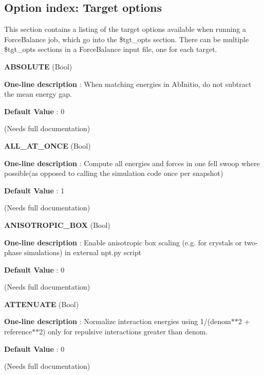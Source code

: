 \hypertarget{glossary_tgt_option_index}{}\subsection{\-Option index\-: Target options}\label{glossary_tgt_option_index}
\-This section contains a listing of the target options available when running a \-Force\-Balance job, which go into the \$tgt\-\_\-opts section. \-There can be multiple \$tgt\-\_\-opts sections in a \-Force\-Balance input file, one for each target.

\begin{DoxyItemize}
\item {\bfseries  \-A\-B\-S\-O\-L\-U\-T\-E } (\-Bool) \par
{\bfseries  \-One-\/line description }\-: \-When matching energies in \-Ab\-Initio, do not subtract the mean energy gap. \par
{\bfseries  \-Default \-Value }\-: 0 \par
(\-Needs full documentation)\end{DoxyItemize}
\begin{DoxyItemize}
\item {\bfseries  \-A\-L\-L\-\_\-\-A\-T\-\_\-\-O\-N\-C\-E } (\-Bool) \par
{\bfseries  \-One-\/line description }\-: \-Compute all energies and forces in one fell swoop where possible(as opposed to calling the simulation code once per snapshot) \par
{\bfseries  \-Default \-Value }\-: 1 \par
(\-Needs full documentation)\end{DoxyItemize}
\begin{DoxyItemize}
\item {\bfseries  \-A\-N\-I\-S\-O\-T\-R\-O\-P\-I\-C\-\_\-\-B\-O\-X } (\-Bool) \par
{\bfseries  \-One-\/line description }\-: \-Enable anisotropic box scaling (e.\-g. for crystals or two-\/phase simulations) in external npt.\-py script \par
{\bfseries  \-Default \-Value }\-: 0 \par
(\-Needs full documentation)\end{DoxyItemize}
\begin{DoxyItemize}
\item {\bfseries  \-A\-T\-T\-E\-N\-U\-A\-T\-E } (\-Bool) \par
{\bfseries  \-One-\/line description }\-: \-Normalize interaction energies using 1/(denom$\ast$$\ast$2 + reference$\ast$$\ast$2) only for repulsive interactions greater than denom. \par
{\bfseries  \-Default \-Value }\-: 0 \par
(\-Needs full documentation)\end{DoxyItemize}
